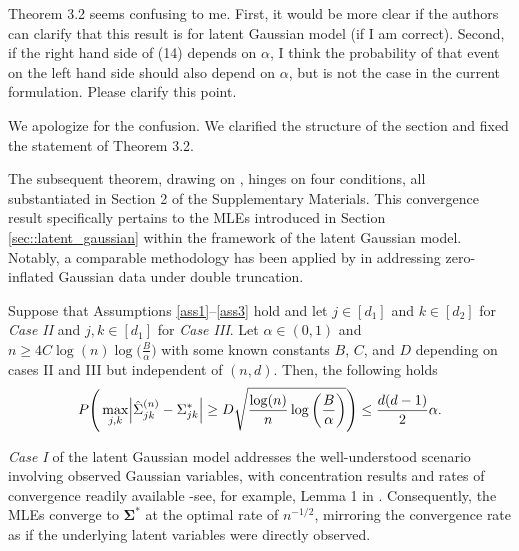 \begin{point}
    Theorem 3.2 seems confusing to me. First, it would be more clear if the authors can clarify that this result is for latent Gaussian model (if I am correct). Second, if the right hand side of (14) depends on \(\alpha\), I think the probability of that event on the left hand side should also depend on \(\alpha\), but is not the case in the current formulation. Please clarify this point.
\end{point}

\begin{reply}
    We apologize for the confusion. We clarified the structure of the section and fixed the statement of Theorem 3.2.
\end{reply}

\begin{change}
    The subsequent theorem, drawing on \citet{Mei18}, hinges on four conditions, all substantiated in Section 2 of the Supplementary Materials. This convergence result specifically pertains to the MLEs introduced in Section \ref{sec::latent_gaussian} within the framework of the latent Gaussian model. Notably, a comparable methodology has been applied by \citet{Anne19} in addressing zero-inflated Gaussian data under double truncation.

    \begin{theorem*}
        Suppose that Assumptions \ref{ass1}--\ref{ass3} hold and let $j \in [d_1]$ and $k \in [d_2]$ for  \textit{Case II} and $j,k \in [d_1]$ for \textit{Case III}. Let $\alpha \in (0,1)$ and \(n \geq 4 C \log(n) \log\Big(\frac{B}{\alpha}\Big)\) with some known constants $B$, $C$, and $D$ depending on cases II and III but independent of $(n,d)$. Then, the following holds
        \begin{equation*}
            P\Bigg(\max_{j,k}\abs{\hat{\Sigma}_{jk}^{(n)} - \Sigma_{jk}^{*}} \geq D\sqrt{\frac{\log(n)}{n} \log\bigg(\frac{B}{\alpha}\bigg)}\Bigg) \leq \frac{d(d-1)}{2}\alpha.
        \end{equation*}
    \end{theorem*}
    \textit{Case I} of the latent Gaussian model addresses the well-understood scenario involving observed Gaussian variables, with concentration results and rates of convergence readily available -see, for example, Lemma 1 in \citet{Ravikumar11}. Consequently, the MLEs converge to \(\mathbf{\Sigma}^{*}\) at the optimal rate of \(n^{-1/2}\), mirroring the convergence rate as if the underlying latent variables were directly observed.
\end{change}

